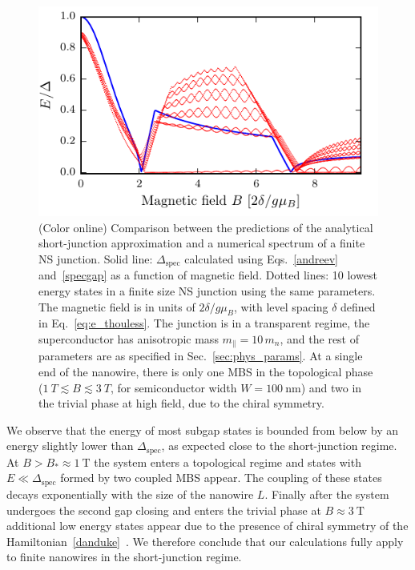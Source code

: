 \begin{figure}[t]
\includegraphics[width=\columnwidth]{chapter_shortjunction/figures/finite}
\caption{(Color online) Comparison between the predictions of the analytical short-junction approximation and a numerical spectrum of a finite NS junction.
Solid line: $\Delta_\textrm{spec}$ calculated using Eqs.~\eqref{andreev} and~\eqref{specgap} as a function of magnetic field.
Dotted lines: 10 lowest energy states in a finite size NS junction using the same parameters.
The magnetic field is in units of $2\delta/g\mu_B$, with level spacing $\delta$ defined in Eq.~\eqref{eq:e_thouless}.
The junction is in a transparent regime, the superconductor has anisotropic mass $m_\parallel = 10\, m_n$, and the rest of parameters are as specified in Sec.~\ref{sec:phys_params}.
At a single end of the nanowire, there is only one MBS in the topological phase ($\SI{1}{T}\lesssim B \lesssim \SI{3}{T}$, for semiconductor width $W=\SI{100}{\nm}$) and two in the trivial phase at high field, due to the chiral symmetry.}
\label{fig:finite}
\end{figure}

We observe that the energy of most subgap states is bounded from below by an energy slightly lower than $\Delta_\textrm{spec}$, as expected close to the short-junction regime.
At $B > B_* \approx \SI{1}{\tesla}$ the system enters a topological regime and states with $E \ll \Delta_\textrm{spec}$ formed by two coupled MBS appear.
The coupling of these states decays exponentially with the size of the nanowire $L$.
Finally after the system undergoes the second gap closing and enters the trivial phase at $B \approx \SI{3}{\tesla}$ additional low energy states appear due to the presence of chiral symmetry of the Hamiltonian~\eqref{danduke}~\cite{Schnyder2009, Ryu2010, Tewari2012}.
We therefore conclude that our calculations fully apply to finite nanowires in the short-junction regime.

